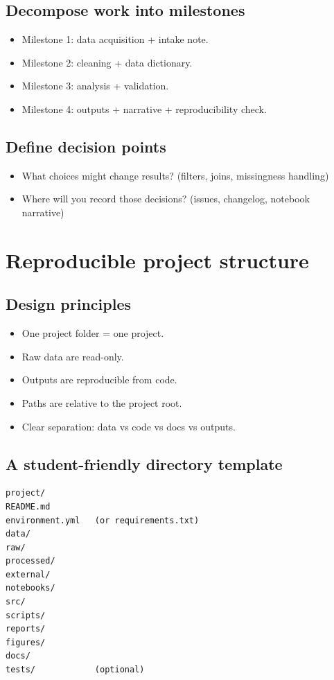 \subsection{Decompose work into milestones}
\begin{itemize}
\item Milestone 1: data acquisition + intake note.
\item Milestone 2: cleaning + data dictionary.
\item Milestone 3: analysis + validation.
\item Milestone 4: outputs + narrative + reproducibility check.
\end{itemize}

\subsection{Define decision points}
\begin{itemize}
\item What choices might change results? (filters, joins, missingness handling)
\item Where will you record those decisions? (issues, changelog, notebook narrative)
\end{itemize}

\section{Reproducible project structure}
\subsection{Design principles}
\begin{itemize}
\item One project folder = one project.
\item Raw data are read-only.
\item Outputs are reproducible from code.
\item Paths are relative to the project root.
\item Clear separation: data vs code vs docs vs outputs.
\end{itemize}

\subsection{A student-friendly directory template}
\begin{verbatim}
project/
README.md
environment.yml   (or requirements.txt)
data/
raw/
processed/
external/
notebooks/
src/
scripts/
reports/
figures/
docs/
tests/            (optional)
\end{verbatim}

